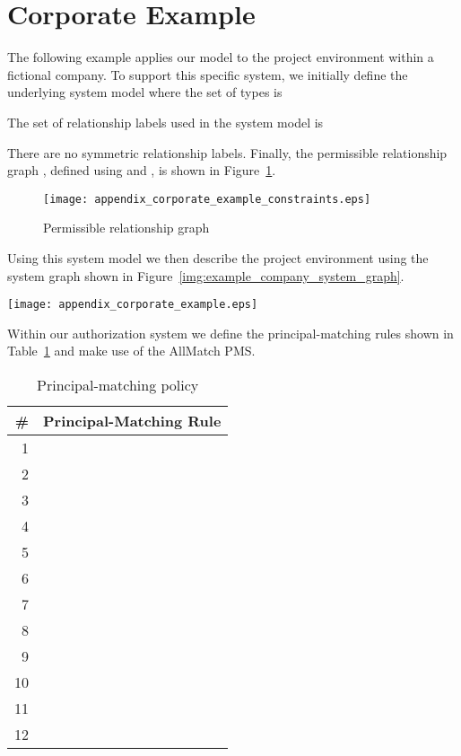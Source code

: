 \documentclass{article}
\begin{document}



\clearpage

\appendix
\section{Corporate Example}\label{appendix:section:example}

The following example applies our model to the project environment within a fictional company. To support this specific system, we initially define the underlying system model  where the set of types is

The set of relationship labels used in the system model is

There are no symmetric relationship labels.
Finally, the permissible relationship graph , defined using  and , is shown in Figure~\ref{img:example_company_edge_constraints}.

\begin{figure}[!ht]
  \centering
  \texttt{[image: appendix\_corporate\_example\_constraints.eps]}
  \caption{Permissible relationship graph}\label{img:example_company_edge_constraints}
\end{figure}

Using this system model we then describe the project environment using the system graph shown in Figure~\ref{img:example_company_system_graph}.

\begin{figure*}[!ht]
  \centering
  \texttt{[image: appendix\_corporate\_example.eps]}
  \caption{System graph}\label{img:example_company_system_graph}
\end{figure*}

Within our authorization system we define the principal-matching rules shown in Table~\ref{tbl:example_company_principal_matching_policy} and make use of the \textsf{AllMatch} PMS.

\begin{table}[!ht]\centering
  {\renewcommand{\arraystretch}{1.25}
  \begin{tabular}{|r|l|}
    \hline
        \bf \# & \bf Principal-Matching Rule \\
    \hline
    \hline
        1 &  \\
        2 &  \\
        3 &  \\
        4 &  \\
        5 &  \\
        6 &  \\
        7 &  \\
        8 &  \\
        9 &  \\
        10 &  \\
        11 &  \\
        12 &  \\
    \hline
  \end{tabular}}
\caption{Principal-matching policy}\label{tbl:example_company_principal_matching_policy}
\end{table}
\end{document}

